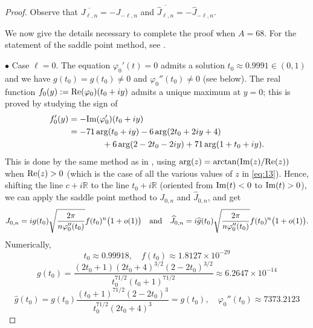 \documentclass[reqno,12pt]{article}
\theoremstyle{remark}
\begin{document}
\begin{proof}
Observe that $\overline{J_{\ell,n}}=-J_{-\ell,n}$ and $\overline{\widehat{J}_{\ell,n}}=-\widehat{J}_{-\ell,n}$.

\medskip

We now give the details necessary to complete the proof when $A=68$. For the statement of the saddle point method, see \cite[Lemma 3]{ri2}.


\medskip


\noindent $\bullet$ Case $\ell=0$. 
 The equation $\varphi_0'(t)=0$ admits a solution
$t_0\approx 0.9991\in(0,1)$
and we have $g(t_0)=\widehat{g}(t_0)\neq 0$ and $\varphi_0''(t_0)\neq 0$ (see below). The real function $f_0(y):=\textup{Re}(\varphi_0)(t_0+iy)$ admits a unique maximum at $y=0$; this is proved by studying the sign of 
\begin{align}
f_0'(y)&=-\textup{Im}(\varphi_0')(t_0+iy) \notag
\\
&=-71\arg(t_0+iy)-6\arg(2t_0+2iy+4) \notag
\\&\qquad \qquad
+6\arg(2-2t_0-2iy)+71\arg(1+t_0+iy). \label{eq:13}
\end{align}
This is done by the same method as in \cite[Lemma 4]{ri2},  using
$\arg(z)=\arctan(\textup{Im}(z)/\textup{Re}(z))$ when $\textup{Re}(z)>0$ (which is the case of all the various values of $z$ in \eqref{eq:13}). Hence, shifting the line $c+i\mathbb R$ to the line $t_0+i\mathbb R$ (oriented from $\textup{Im}(t)<0$ to $\textup{Im}(t)>0$), we can apply the saddle point method to $J_{0,n}$ and $\widehat{J}_{0,n}$, and get
$$
J_{0,n}= ig(t_0) \sqrt{\frac{2\pi}{n\varphi_0''(t_0)} } f(t_0)^n \big(1+o(1)\big) \quad \textup{and} \quad 
\widehat{J}_{0,n}= i \widehat{g}(t_0) \sqrt{\frac{2\pi}{n\varphi_0''(t_0)} } f(t_0)^n \big(1+o(1)\big).
$$
Numerically, 
$$
t_0\approx 0.99918,
\quad
f(t_0)\approx 1.8127 \times 10^{-29}  
$$
$$
g(t_0)=\frac{(2t_0+1)(2t_0+4)^{3/2}(2-2t_0)^{3/2}}
{t_0^{71/2}(t_0+1)^{71/2}}\approx 6.2647 \times 10^{-14}
$$
$$
\widehat{g}(t_0)=g(t_0)\frac{(t_0+1)^{71/2}(2-2t_0)^3}{t_0^{71/2}(2t_0+4)^3}=g(t_0), \quad \varphi_0''(t_0)\approx 7373.2123
$$


\end{proof}
\end{document}

